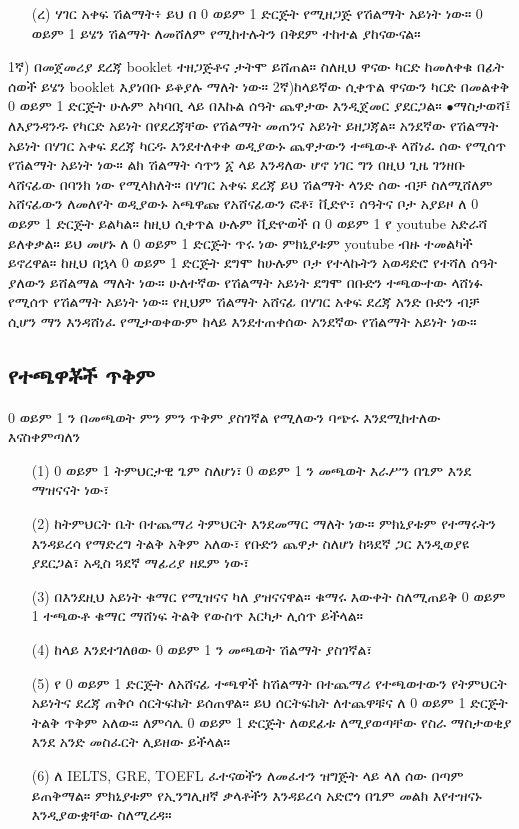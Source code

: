 \documentclass[a4paper,12pt]{article}
\newenvironment{geez}{\geezfont}{}
\begin{document}
\begin{enumerate}
\item[(ረ)] {\color{red}ሃገር አቀፍ ሽልማት፥} ይህ በ 0 ወይም 1 ድርጅት የሚዘጋጅ የሽልማት አይነት ነው። 0 ወይም 1 ይሄን ሽልማት ለመሸለም የሚከተሉትን በቅደም ተከተል ያከናውናል።
\end{enumerate}
\justify
{\color{red}1ኛ)} በመጀመሪያ ደረጃ booklet ተዘጋጅቶና ታትሞ ይሸጠል። ስለዚህ ዋናው ካርድ ከመለቀቁ በፊት ሰወች ይሄን booklet እያነበቡ ይቆያሉ ማለት ነው።
\justify
{\color{red}2ኛ)}ከላይኛው ሲቀጥል ዋናውን ካርድ በመልቀቅ 0 ወይም 1 ድርጅት ሁሉም አካባቢ ላይ በእኩል ሰዓት ጨዋታው እንዲጀመር ያደርጋል።
\justify
{\color{blue}$\bullet$}{\color{red}ማስታወሻ፤} ለእያንዳንዱ የካርድ አይነት በየደረጃቸው የሽልማት መጠንና አይነት ይዘጋጃል። አንደኛው የሽልማት አይነት በሃገር አቀፍ ደረጃ ካርዱ እንደተለቀቀ ወዲያውኑ ጨዋታውን ተጫውቶ ላሸነፈ ሰው የሚሰጥ የሽልማት አይነት ነው። ልክ ሽልማት ሳጥን ፩ ላይ እንዳለው ሆኖ ነገር ግን በዚህ ጊዜ ገንዘቡ ላሸናፊው በባንክ ነው የሚላክለት። በሃገር አቀፍ ደረጃ ይህ ሽልማት ላንድ ሰው ብቻ ስለሚሸለም አሸናፊውን ለመለየት ወዲያውኑ አጫዋጩ የአሸናፊውን ፎቶ፣ ቪድዮ፣ ሰዓትና ቦታ አያይዞ ለ 0 ወይም 1 ድርጅት ይልካል። ከዚህ ሲቀጥል ሁሉም ቪድዮወች በ 0 ወይም 1 የ youtube አድራሻ ይለቀቃል። ይህ መሆኑ ለ 0 ወይም 1 ድርጅት ጥሩ ነው ምክኒያቱም youtube ብዙ ተመልካች ይኖረዋል። ከዚህ በኋላ 0 ወይም 1 ድርጅት ደግሞ ከሁሉም ቦታ የተላኩትን አወዳድሮ የተሻለ ሰዓት ያለውን ይሸልማል ማለት ነው። ሁለተኛው የሽልማት አይነት ደግሞ በቡድን ተጫውተው ላሸነፉ የሚሰጥ የሽልማት አይነት ነው። የዚህም ሽልማት አሸናፊ በሃገር አቀፍ ደረጃ አንድ ቡድን ብቻ ሲሆን ማን እንዳሸነፈ የሚታወቀውም ከላይ እንደተጠቀሰው አንደኛው የሽልማት አይነት ነው።
\subsection{\begin{geez}የተጫዋቾች ጥቅም\end{geez}}
0 ወይም 1 ን በመጫወት ምን ምን ጥቅም ያስገኛል የሚለውን ባጭሩ እንደሚከተለው እናስቀምጣለን
\begin{enumerate}
\item[(1)] 0 ወይም 1 ትምህርታዊ ጌም ስለሆነ፣ 0 ወይም 1 ን መጫወት  እራሥን በጌም እንደ ማዝናናት ነው፣
\item[(2)]ከትምህርት ቤት በተጨማሪ ትምህርት እንደመማር ማለት ነው። ምክኒያቱም የተማሩትን እንዳይረሳ የማድረግ ትልቅ አቅም አለው፣ የቡድን ጨዋታ ስለሆነ ከጓደኛ ጋር እንዲወያዩ ያደርጋል፣ አዲስ ጓደኛ ማፊሪያ ዘዴም ነው፣
\item[(3)] በእንደዚህ አይነት ቁማር የሚዝናና ካለ ያዝናናዋል። ቁማሩ እውቀት ስለሚጠይቅ 0 ወይም 1 ተጫውቶ ቁማር ማሸነፍ ትልቅ የውስጥ እርካታ ሊሰጥ ይችላል። 
\item[(4)] ከላይ እንደተገለፀው 0 ወይም 1 ን መጫወት ሽልማት ያስገኛል፣
\end{enumerate}
\begin{enumerate}
\item[(5)] የ 0 ወይም 1 ድርጅት ለአሸናፊ ተጫዋች ከሽልማት በተጨማሪ የተጫወተውን የትምህርት አይነትና ደረጃ ጠቅሶ ሰርትፍኬት ይሰጠዋል። ይህ ሰርትፍኬት ለተጨዋቹና ለ 0 ወይም 1 ድርጅት ትልቅ ጥቅም አለው። ለምሳሌ 0 ወይም 1 ድርጅት ለወደፊቱ ለሚያወጣቸው የስራ ማስታወቂያ እንደ አንድ መስፈርት ሊይዘው ይችላል።
\item[(6)] ለ IELTS, GRE, TOEFL ፈተናወችን ለመፈተን ዝግጅት ላይ ላለ ሰው በጣም ይጠቅማል። ምክኒያቱም የኢንግሊዘኛ ቃላቶችን እንዳይረሳ አድሮጎ በጌም መልክ እየተዝናኑ እንዲያውቋቸው ስለሚረዳ። 
\end{enumerate}
\end{document}

